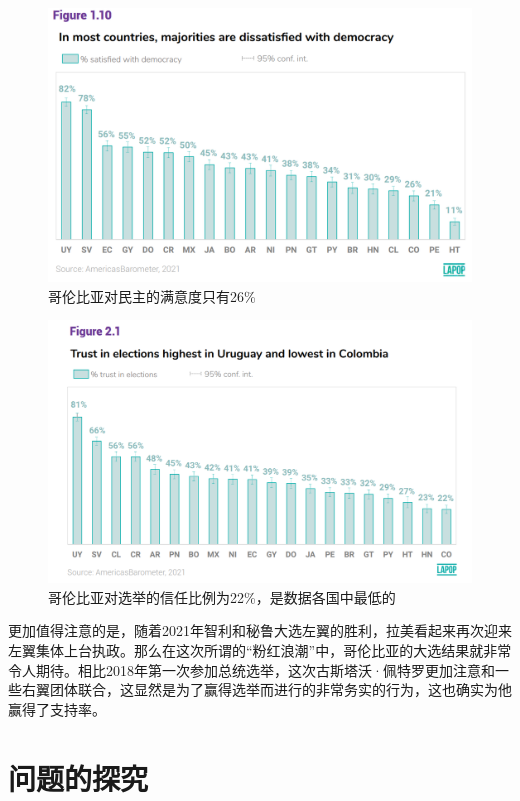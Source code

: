 \documentclass{phyasgn}\usepackage{nag}
\begin{document}
 \begin{figure}[!h]
                    	\centering
                    	\includegraphics[width=.9\linewidth]{pic/6.png}
                    	\caption{哥伦比亚对民主的满意度只有26\%}
                    	\label{fig:6}
                    	\end{figure}
 \begin{figure}[!h]
                    	\centering
                    	\includegraphics[width=.9\linewidth]{pic/7.png}
                    	\caption{哥伦比亚对选举的信任比例为22\%，是数据各国中最低的}
                    	\label{fig:7}
                    	\end{figure}
\par 更加值得注意的是，随着2021年智利和秘鲁大选左翼的胜利，拉美看起来再次迎来左翼集体上台执政。那么在这次所谓的“粉红浪潮”中，哥伦比亚的大选结果就非常令人期待。相比2018年第一次参加总统选举，这次古斯塔沃·佩特罗更加注意和一些右翼团体联合，这显然是为了赢得选举而进行的非常务实的行为，这也确实为他赢得了支持率。
\section{问题的探究}
\end{document}
